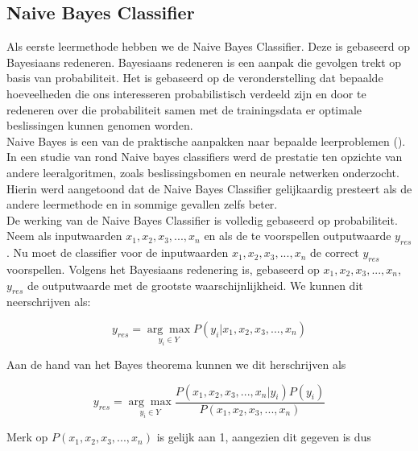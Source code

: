 \subsection{Naive Bayes Classifier}\label{Naive Bayes Classifier}

Als eerste leermethode hebben we de Naive Bayes Classifier. Deze is gebaseerd op Bayesiaans redeneren. Bayesiaans redeneren is een aanpak die gevolgen trekt op basis van probabiliteit. Het is gebaseerd op de veronderstelling dat bepaalde hoeveelheden die ons interesseren probabilistisch verdeeld zijn en door te redeneren over die probabiliteit samen met de trainingsdata er optimale beslissingen kunnen genomen worden.\\%
Naive Bayes is een van de praktische aanpakken naar bepaalde leerproblemen (\cite{mitchell1997machine}). In een studie van \cite{Michie94machinelearning} rond Naive bayes classifiers werd de  prestatie ten opzichte van andere leeralgoritmen, zoals beslissingsbomen en neurale netwerken onderzocht. Hierin werd aangetoond dat de Naive Bayes Classifier gelijkaardig presteert als de andere leermethode en in sommige gevallen zelfs beter.\\
%
De werking van de Naive Bayes Classifier is volledig gebaseerd op probabiliteit. Neem als inputwaarden $x_{1} , x_{2}, x_{3}, ..., x_{n}$ en als de te voorspellen outputwaarde $y_{res}$. Nu moet de classifier voor de inputwaarden $x_{1} , x_{2}, x_{3}, ..., x_{n}$ de correct $y_{res}$ voorspellen. Volgens het Bayesiaans redenering is, gebaseerd op $x_{1} , x_{2}, x_{3}, ..., x_{n}$,  $y_{res}$ de outputwaarde met de grootste waarschijnlijkheid. We kunnen dit neerschrijven als:

\[y_{res} = \underset{y_i \in Y}{\arg\max}P(y_i|x_{1},x_{2},x_{3},...,x_{n}) \] 

Aan de hand van het Bayes theorema kunnen we dit herschrijven als

\[ y_{res} = \underset{y_i \in Y}{\arg\max}\frac{P(x_{1},x_{2},x_{3},...,x_{n}|y_i)P(y_i)}{P(x_{1},x_{2}, x_{3},...,x_{n})} \]

 Merk op $P(x_{1},x_{2},x_{3},...,x_{n})$ is gelijk aan 1, aangezien dit gegeven is dus

